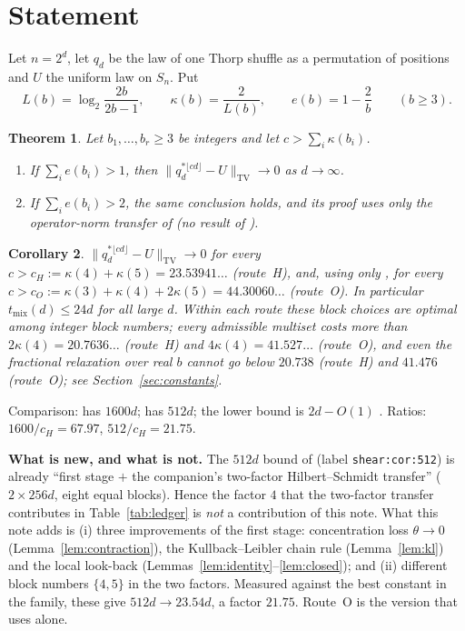 \documentclass[11pt]{amsart}
\newtheorem{theorem}{Theorem}[section]
\newtheorem{corollary}[theorem]{Corollary}
\theoremstyle{remark}
\newcommand{\TV}{\mathrm{TV}}
\begin{document}
\section{Statement}
Let $n=2^d$, let $q_d$ be the law of one Thorp shuffle as a permutation of positions and $U$ the
uniform law on $S_n$. Put
\[
L(b)=\log_2\frac{2b}{2b-1},\qquad \kappa(b)=\frac2{L(b)},\qquad e(b)=1-\frac2b\qquad(b\ge3).
\]
\begin{theorem}\label{thm:main}
Let $b_1,\dots,b_r\ge3$ be integers and let $c>\sum_i\kappa(b_i)$.
\begin{enumerate}
\item[(H)] If $\sum_i e(b_i)>1$, then $\|q_d^{*\lfloor cd\rfloor}-U\|_{\TV}\to0$ as $d\to\infty$.
\item[(O)] If $\sum_i e(b_i)>2$, the same conclusion holds, and its proof uses only the
operator-norm transfer of \cite{oai-thorp} (no result of \cite{oai-transfer}).
\end{enumerate}
\end{theorem}
\begin{corollary}\label{cor:constants}
$\|q_d^{*\lfloor cd\rfloor}-U\|_{\TV}\to0$ for every $c>c_H:=\kappa(4)+\kappa(5)=23.53941\ldots$
(route~H), and, using only \cite{oai-thorp}, for every $c>c_O:=\kappa(3)+\kappa(4)+2\kappa(5)=44.30060\ldots$
(route~O). In particular $t_{\mathrm{mix}}(d)\le24d$ for all large $d$. Within each route these block
choices are optimal among integer block numbers; every admissible multiset costs more than
$2\kappa(4)=20.7636\ldots$ (route~H) and $4\kappa(4)=41.527\ldots$ (route~O), and even the fractional
relaxation over real $b$ cannot go below $20.738$ (route~H) and $41.476$ (route~O); see Section~\ref{sec:constants}.
\end{corollary}
Comparison: \cite[Thm.~1.1]{oai-thorp} has $1600d$; \cite[Cor.~11.4]{oai-frames} has $512d$;
the lower bound is $2d-O(1)$ \cite[Thm.~1.1]{oai-thorp}. Ratios: $1600/c_H=67.97$, $512/c_H=21.75$.

\smallskip\noindent\textbf{What is new, and what is not.} The $512d$ bound of
\cite[Cor.~11.4]{oai-frames} (label \texttt{shear:cor:512}) is already ``first stage $+$ the companion's
two-factor Hilbert--Schmidt transfer'' ($2\times256d$, eight equal blocks). Hence the factor $4$ that
the two-factor transfer contributes in Table~\ref{tab:ledger} is \emph{not} a contribution of this note.
What this note adds is (i) three improvements of the first stage: concentration loss $\theta\to0$
(Lemma~\ref{lem:contraction}), the Kullback--Leibler chain rule (Lemma~\ref{lem:kl}) and the local
look-back (Lemmas~\ref{lem:identity}--\ref{lem:closed}); and (ii) different block numbers $\{4,5\}$ in
the two factors. Measured against the best constant in the family, these give $512d\to23.54d$, a factor
$21.75$. Route~O is the version that uses \cite{oai-thorp} alone.
\end{document}
